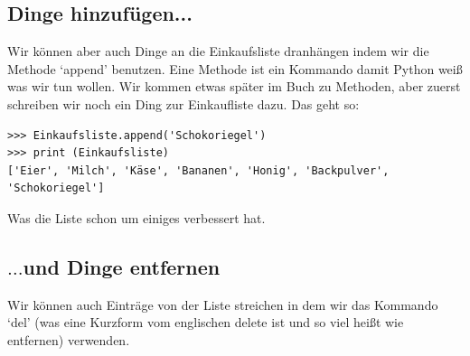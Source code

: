 \subsection*{\color{BrickRed}Dinge hinzufügen...}

Wir können aber auch Dinge an die Einkaufsliste dranhängen indem wir die Methode `append' benutzen. Eine Methode ist ein Kommando damit Python weiß was wir tun wollen. Wir kommen etwas später im Buch zu Methoden, aber zuerst schreiben wir noch ein Ding zur Einkaufliste dazu. Das geht so:

\begin{Verbatim}[frame=single]
>>> Einkaufsliste.append('Schokoriegel')
>>> print (Einkaufsliste)
['Eier', 'Milch', 'Käse', 'Bananen', 'Honig', 'Backpulver', 'Schokoriegel']
\end{Verbatim}

Was die Liste schon um einiges verbessert hat.

\subsection*{\color{BrickRed}$\ldots$und Dinge entfernen}


Wir können auch Einträge von der Liste streichen in dem wir das Kommando `del' (was eine Kurzform vom englischen delete ist und so viel heißt wie entfernen) verwenden.

